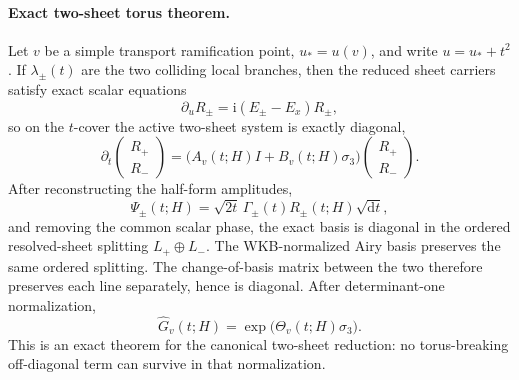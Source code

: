 \documentclass[aps,prl,reprint,superscriptaddress,nofootinbib]{revtex4-2}
\newcommand{\ii}{\mathrm{i}}
\newcommand{\dd}{\mathrm{d}}
\newcommand{\hatG}{\widehat G}
\begin{document}
\paragraph*{Exact two-sheet torus theorem.}
Let $v$ be a simple transport ramification point, $u_*=u(v)$, and write $u=u_*+t^2$. If $\lambda_\pm(t)$ are the two colliding local branches, then the reduced sheet carriers satisfy exact scalar equations
\begin{equation}
 \partial_uR_\pm=\ii(E_\pm-E_x)R_\pm,
\end{equation}
so on the $t$-cover the active two-sheet system is exactly diagonal,
\begin{equation}
 \partial_t\begin{pmatrix}R_+\\R_-\end{pmatrix}=
 \bigl(A_v(t;H)I+B_v(t;H)\sigma_3\bigr)
 \begin{pmatrix}R_+\\R_-\end{pmatrix}.
\end{equation}
After reconstructing the half-form amplitudes,
\begin{equation}
 \Psi_\pm(t;H)=\sqrt{2t}\,\Gamma_\pm(t)R_\pm(t;H)\sqrt{\dd t},
\end{equation}
and removing the common scalar phase, the exact basis is diagonal in the ordered resolved-sheet splitting $L_+\oplus L_-$. The WKB-normalized Airy basis preserves the same ordered splitting. The change-of-basis matrix between the two therefore preserves each line separately, hence is diagonal. After determinant-one normalization,
\begin{equation}
 \hatG_v(t;H)=\exp\!\bigl(\Theta_v(t;H)\sigma_3\bigr).
 \label{eq:torus}
\end{equation}
This is an exact theorem for the canonical two-sheet reduction: no torus-breaking off-diagonal term can survive in that normalization.
\end{document}
